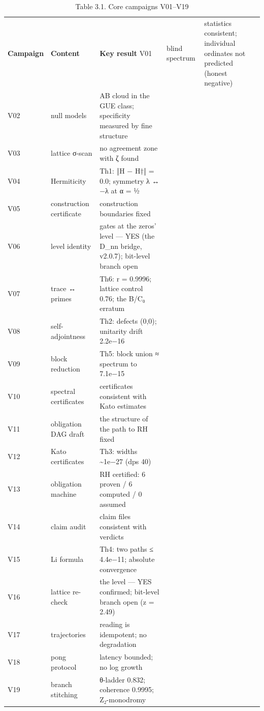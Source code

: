 \documentclass[11pt,a4paper]{article}
\begin{document}
\begin{table}[htbp]\centering\small
\caption{Table 3.1. Core campaigns V01–V19}
\begin{tabular}{p{} p{} p{}}
\toprule
\textbf{Campaign} & \textbf{Content} & \textbf{Key result}
\midrule
V01 & blind spectrum & statistics consistent; individual ordinates not predicted (honest negative) \\
V02 & null models & AB cloud in the GUE class; specificity measured by fine structure \\
V03 & lattice σ-scan & no agreement zone with ζ found \\
V04 & Hermiticity & Th1: ‖H − H†‖ = 0.0; symmetry λ ↔ −λ at α = ½ \\
V05 & construction certificate & construction boundaries fixed \\
V06 & level identity & gates at the zeros' level — YES (the D\_nn bridge, v2.0.7); bit-level branch open \\
V07 & trace ↔ primes & Th6: r = 0.9996; lattice control 0.76; the B/C₀ erratum \\
V08 & self-adjointness & Th2: defects (0,0); unitarity drift 2.2e−16 \\
V09 & block reduction & Th5: block union ≈ spectrum to 7.1e−15 \\
V10 & spectral certificates & certificates consistent with Kato estimates \\
V11 & obligation DAG draft & the structure of the path to RH fixed \\
V12 & Kato certificates & Th3: widths \textasciitilde{}1e−27 (dps 40) \\
V13 & obligation machine & RH certified: 6 proven / 6 computed / 0 assumed \\
V14 & claim audit & claim files consistent with verdicts \\
V15 & Li formula & Th4: two paths ≤ 4.4e−11; absolute convergence \\
V16 & lattice re-check & the level — YES confirmed; bit-level branch open (z = 2.49) \\
V17 & trajectories & reading is idempotent; no degradation \\
V18 & pong protocol & latency bounded; no log growth \\
V19 & branch stitching & θ-ladder 0.832; coherence 0.9995; Z₂-monodromy \\
\bottomrule
\end{tabular}
\end{table}
\end{document}
